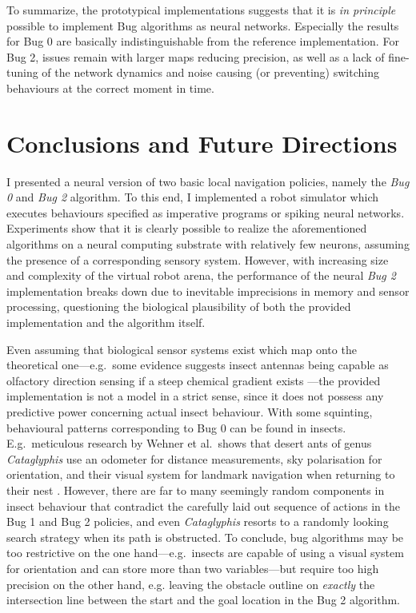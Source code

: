 \documentclass[letterpaper,10pt,conference]{ieeeconf}
\begin{document}
To summarize, the prototypical implementations suggests that it is \emph{in principle} possible to implement Bug algorithms as neural networks. Especially the results for Bug 0 are basically indistinguishable from the reference implementation. For Bug 2, issues remain with larger maps reducing precision, as well as a lack of fine-tuning of the network dynamics and noise causing (or preventing) switching behaviours at the correct moment in time.

\section{Conclusions and Future Directions}
\label{sec:conclusion}

I presented a neural version of two basic local navigation policies, namely the \emph{Bug 0} and \emph{Bug 2} algorithm. To this end, I implemented a robot simulator which executes behaviours specified as imperative programs or spiking neural networks. Experiments show that it is clearly possible to realize the aforementioned algorithms on a neural computing substrate with relatively few neurons, assuming the presence of a corresponding sensory system. However, with increasing size and complexity of the virtual robot arena, the performance of the neural \emph{Bug 2} implementation breaks down due to inevitable imprecisions in memory and sensor processing, questioning the biological plausibility of both the provided implementation and the algorithm itself.

Even assuming that biological sensor systems exist which map onto the theoretical one---e.g.~some evidence suggests insect antennas being capable as olfactory direction sensing if a steep chemical gradient exists \cite{schneider1964insect}---the provided implementation is not a model in a strict sense, since it does not possess any predictive power concerning actual insect behaviour. With some squinting, behavioural patterns corresponding to Bug 0 can be found in insects. E.g.~meticulous research by Wehner et al.~shows that desert ants of genus \emph{Cataglyphis} use an odometer for distance measurements, sky polarisation for orientation, and their visual system for landmark navigation when returning to their nest \cite{wehner1995pathintegration,wehner2003desert,wehner2004distance}. However, there are far to many seemingly random components in insect behaviour that contradict the carefully laid out sequence of actions in the Bug 1 and Bug 2 policies, and even \emph{Cataglyphis} resorts to a randomly looking search strategy when its path is obstructed. To conclude, bug algorithms may be too restrictive on the one hand---e.g.~insects are capable of using a visual system for orientation and can store more than two variables---but require too high precision on the other hand, e.g. leaving the obstacle outline on \emph{exactly} the intersection line between the start and the goal location in the Bug 2 algorithm.
\end{document}
